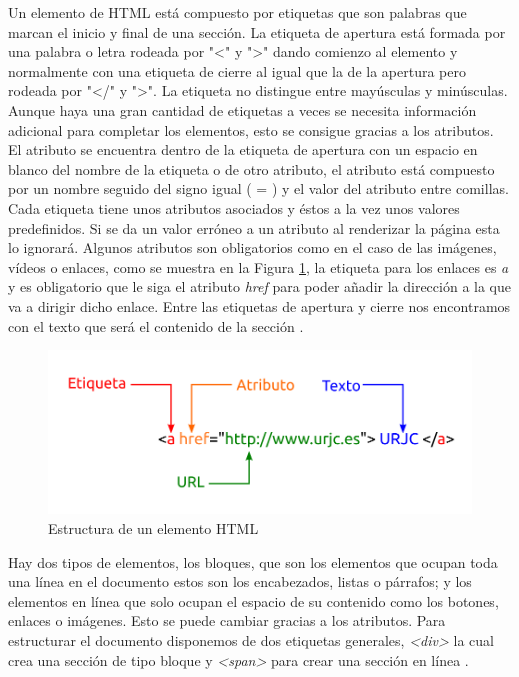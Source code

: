 Un elemento de HTML está compuesto por etiquetas que son palabras que marcan el inicio y final de una sección. La etiqueta de apertura está formada por una palabra o letra rodeada por "\textless" y "\textgreater" dando comienzo al elemento y normalmente con una etiqueta de cierre al igual que la de la apertura pero rodeada por "\textless/" y "\textgreater". La etiqueta no distingue entre mayúsculas y minúsculas. Aunque haya una gran cantidad de etiquetas a veces se necesita información adicional para completar los elementos, esto se consigue gracias a los atributos.\\ 

El atributo se encuentra dentro de la etiqueta de apertura con un espacio en blanco del nombre de la etiqueta o de otro atributo, el atributo está compuesto por un nombre seguido del signo igual ( = ) y el valor del atributo entre comillas. \\

Cada etiqueta tiene unos atributos asociados y éstos a la vez unos valores predefinidos. Si se da un valor erróneo a un atributo al renderizar la página esta lo ignorará. Algunos atributos son obligatorios como en el caso de las imágenes, vídeos o enlaces, como se muestra en la Figura \ref{fig:elemento}, la etiqueta para los enlaces es \textit{a} y es obligatorio que le siga el atributo \textit{href}  para poder añadir la dirección a la que va a dirigir dicho enlace. Entre las etiquetas de apertura y cierre nos encontramos con el texto que será el contenido de la sección \cite{etiqueta}.

\begin{figure}[H]
    \centering
    \includegraphics[width=12cm, keepaspectratio]{img/elemento.png}
    \caption{Estructura de un elemento HTML}
    \label{fig:elemento}
\end{figure}

Hay dos tipos de elementos, los bloques, que son los elementos que ocupan toda una línea en el documento estos son los encabezados, listas o párrafos; y los elementos en línea que solo ocupan el espacio de su contenido como los botones, enlaces o imágenes. Esto se puede cambiar gracias a los atributos. Para estructurar el documento disponemos de dos etiquetas generales, \textit{\textless div\textgreater} la cual crea una sección de tipo bloque y \textit{\textless span\textgreater} para crear una sección en línea \cite{juan2}.\\

